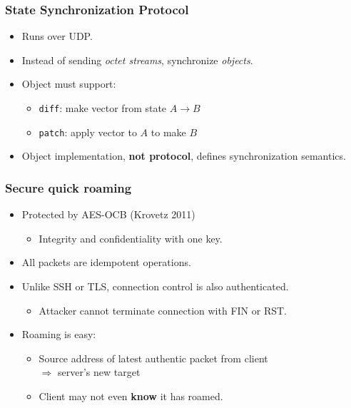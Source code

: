 \documentclass[svgnames]{beamer}
\begin{document}
\begin{frame}

\frametitle{State Synchronization Protocol}

\begin{itemize}

\item Runs over UDP.

\item Instead of sending \emph{octet streams}, synchronize \emph{objects}.

\item Object must support:
\begin{itemize}
\item \texttt{diff}: make vector from state $A \rightarrow B$
\item \texttt{patch}: apply vector to $A$ to make $B$
\end{itemize}

\item Object implementation, \textbf{not protocol}, defines
  synchronization semantics.

\end{itemize}

\end{frame}

\begin{frame}
\frametitle{Secure quick roaming}

\begin{itemize}

\item Protected by AES-OCB (Krovetz 2011)
\begin{itemize}
\item Integrity and confidentiality with one key.
\end{itemize}

\item All packets are idempotent operations.

\item Unlike SSH or TLS, connection control is also authenticated.

\begin{itemize}
\item Attacker cannot terminate connection with FIN or RST.
\end{itemize}

\item Roaming is easy:
\begin{itemize}
\item Source address of latest authentic packet from client \\ $\Rightarrow$
server's new target
\item Client may not even \textbf{know} it has roamed.
\end{itemize}

\end{itemize}

\end{frame}
\end{document}
